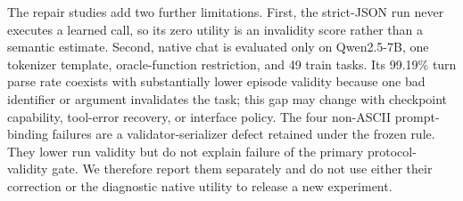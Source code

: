 \documentclass[10pt]{article}
\begin{document}
The repair studies add two further limitations. First, the strict-JSON run never executes a learned call, so its zero utility is an invalidity score rather than a semantic estimate. Second, native chat is evaluated only on Qwen2.5-7B, one tokenizer template, oracle-function restriction, and 49 train tasks. Its 99.19\% turn parse rate coexists with substantially lower episode validity because one bad identifier or argument invalidates the task; this gap may change with checkpoint capability, tool-error recovery, or interface policy. The four non-ASCII prompt-binding failures are a validator-serializer defect retained under the frozen rule. They lower run validity but do not explain failure of the primary protocol-validity gate. We therefore report them separately and do not use either their correction or the diagnostic native utility to release a new experiment.
\end{document}
